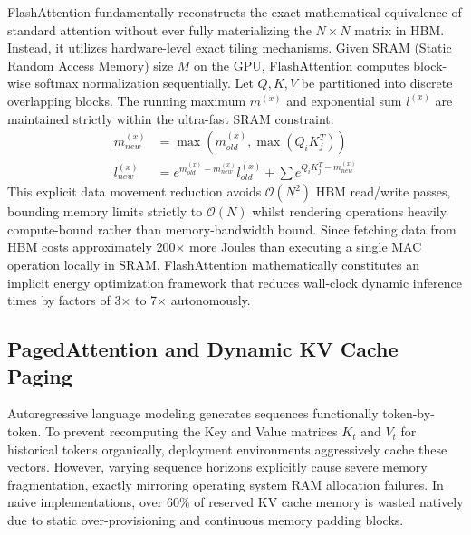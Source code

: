 \documentclass[12pt, a4paper]{report}
\begin{document}
FlashAttention fundamentally reconstructs the exact mathematical equivalence of standard attention without ever fully materializing the $N \times N$ matrix in HBM. Instead, it utilizes hardware-level exact tiling mechanisms. Given SRAM (Static Random Access Memory) size $M$ on the GPU, FlashAttention computes block-wise softmax normalization sequentially. Let $Q, K, V$ be partitioned into discrete overlapping blocks. The running maximum $m^{(x)}$ and exponential sum $l^{(x)}$ are maintained strictly within the ultra-fast SRAM constraint:
\begin{align}
    m_{new}^{(x)} &= \max(m_{old}^{(x)}, \max(Q_i K_j^T)) \\
    l_{new}^{(x)} &= e^{m_{old}^{(x)} - m_{new}^{(x)}} l_{old}^{(x)} + \sum e^{Q_i K_j^T - m_{new}^{(x)}}
\end{align}
This explicit data movement reduction avoids $\mathcal{O}(N^2)$ HBM read/write passes, bounding memory limits strictly to $\mathcal{O}(N)$ whilst rendering operations heavily compute-bound rather than memory-bandwidth bound. Since fetching data from HBM costs approximately 200$\times$ more Joules than executing a single MAC operation locally in SRAM, FlashAttention mathematically constitutes an implicit energy optimization framework that reduces wall-clock dynamic inference times by factors of 3$\times$ to 7$\times$ autonomously.

\subsection{PagedAttention and Dynamic KV Cache Paging}
Autoregressive language modeling generates sequences functionally token-by-token. To prevent recomputing the Key and Value matrices $K_t$ and $V_t$ for historical tokens organically, deployment environments aggressively cache these vectors. However, varying sequence horizons explicitly cause severe memory fragmentation, exactly mirroring operating system RAM allocation failures. In naive implementations, over 60\% of reserved KV cache memory is wasted natively due to static over-provisioning and continuous memory padding blocks.
\end{document}
